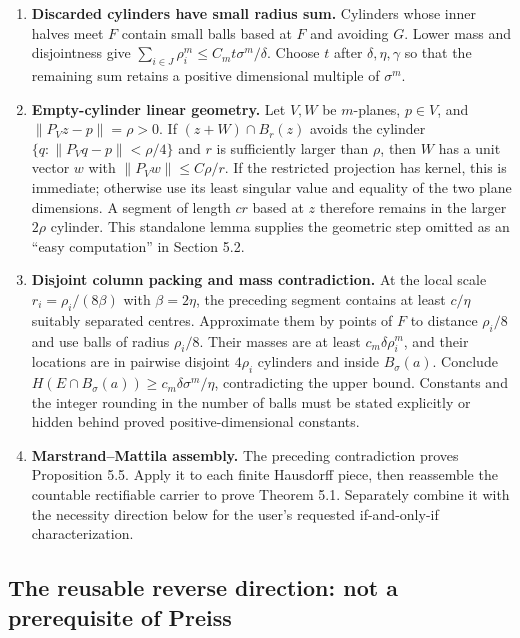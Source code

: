 \begin{enumerate}
\item \textbf{Discarded cylinders have small radius sum.}
Cylinders whose inner halves meet $F$ contain small balls based at $F$ and
avoiding $G$. Lower mass and disjointness give
$\sum_{i\in J}\rho_i^m\leq C_m t\sigma^m/\delta$.
Choose $t$ after $\delta,\eta,\gamma$ so that the remaining sum retains a
positive dimensional multiple of $\sigma^m$.

\item \textbf{Empty-cylinder linear geometry.}
Let $V,W$ be $m$-planes, $p\in V$, and $\|P_Vz-p\|=\rho>0$.
If $(z+W)\cap B_r(z)$ avoids the cylinder
$\{q:\|P_Vq-p\|<\rho/4\}$ and $r$ is sufficiently larger than $\rho$,
then $W$ has a unit vector $w$ with $\|P_Vw\|\leq C\rho/r$.
If the restricted projection has kernel, this is immediate; otherwise use
its least singular value and equality of the two plane dimensions.
A segment of length $c r$ based at $z$ therefore remains in the larger
$2\rho$ cylinder. This standalone lemma supplies the geometric step omitted
as an ``easy computation'' in Section 5.2.

\item \textbf{Disjoint column packing and mass contradiction.}
At the local scale $r_i=\rho_i/(8\beta)$ with $\beta=2\eta$, the preceding segment contains at
least $c/\eta$ suitably separated centres. Approximate them by points of $F$
to distance $\rho_i/8$ and use balls of radius $\rho_i/8$.
Their masses are at least $c_m\delta\rho_i^m$, and their locations are in
pairwise disjoint $4\rho_i$ cylinders and inside $B_\sigma(a)$.
Conclude $H(E\cap B_\sigma(a))\geq c_m\delta\sigma^m/\eta$, contradicting
the upper bound. Constants and the integer rounding in the number of balls
must be stated explicitly or hidden behind proved positive-dimensional constants.

\item \textbf{Marstrand--Mattila assembly.}
The preceding contradiction proves Proposition 5.5. Apply it to each finite
Hausdorff piece, then reassemble the countable rectifiable carrier to prove
Theorem 5.1. Separately combine it with the necessity direction below for
the user's requested if-and-only-if characterization.
\end{enumerate}

\subsection{The reusable reverse direction: not a prerequisite of Preiss}

